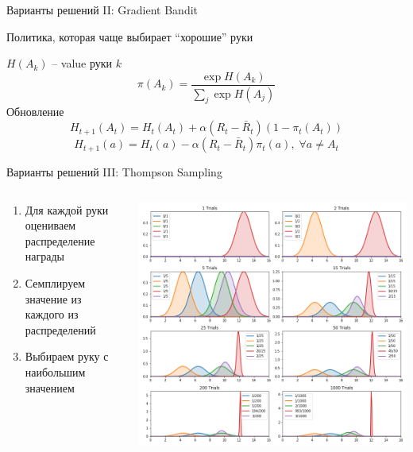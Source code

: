 \documentclass[11pt,aspectratio=169,handout]{beamer}
\begin{document}
\begin{frame}{Варианты решений II: Gradient Bandit \cite{BANDITS2}}

Политика, которая чаще выбирает ``хорошие'' руки

$H(A_k)$ -- value руки $k$
\[
\pi(A_k) = \frac{\exp H(A_k)}{\sum_j \exp H(A_j)}
\]
Обновление
\[
H_{t+1} (A_t) = H_t(A_t) + \alpha (R_t - \bar R_t)(1 - \pi_t(A_t))
\]
\[
H_{t+1} (a) = H_t(a) - \alpha (R_t - \bar R_t)\pi_t(a), \; \forall a \neq A_t
\]

\end{frame}

\begin{frame}{Варианты решений III: Thompson Sampling}

\begin{columns}

\begin{column}{0.4\textwidth}
\begin{enumerate}
\item Для каждой руки оцениваем распределение награды
\item Семплируем значение из каждого из распределений
\item Выбираем руку с наибольшим значением
\end{enumerate}
\end{column}

\begin{column}{0.55\textwidth}

\begin{small}
\begin{center}
\includegraphics[scale=0.2]{images/thompson.png}
\end{center}
\end{small}

\end{column}
\end{columns}

\end{frame}
\end{document}
